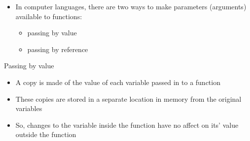 \documentclass[ignorenonframetext,]{beamer}
\providecommand{\tightlist}{%
  \setlength{\itemsep}{0pt}\setlength{\parskip}{0pt}}
\begin{document}
\begin{frame}

\begin{itemize}[<+->]
\tightlist
\item
  In computer languages, there are two ways to make parameters
  (arguments) available to functions:

  \begin{itemize}[<+->]
  \tightlist
  \item
    passing by value
  \item
    passing by reference
  \end{itemize}
\end{itemize}

\end{frame}

\begin{frame}{Passing by value}

\begin{itemize}[<+->]
\tightlist
\item
  A copy is made of the value of each variable passed in to a function
\item
  These copies are stored in a separate location in memory from the
  original variables
\item
  So, changes to the variable inside the function have no affect on its'
  value outside the function
\end{itemize}

\end{frame}
\end{document}
